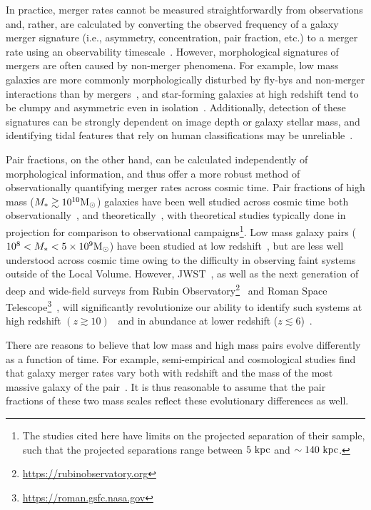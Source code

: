 \documentclass[twocolumn]{aastex631}
\begin{document}
    In practice, merger rates cannot be measured straightforwardly from observations and, rather, are calculated by converting the observed frequency of a galaxy merger signature (i.e., asymmetry, concentration, pair fraction, etc.) to a merger rate using an observability timescale~\citep[e.g.][]{Lotz2011}. However, morphological signatures of mergers are often caused by non-merger phenomena.
    For example, low mass galaxies are more commonly morphologically disturbed by fly-bys and non-merger interactions than by mergers~\citep{Martin2021}, 
    and star-forming galaxies at high redshift tend to be clumpy and asymmetric even in isolation~\citep{Wuyts2013}.
    Additionally, detection of these signatures can be strongly dependent on image depth or galaxy stellar mass, and identifying tidal features that rely on human classifications may be unreliable~\citep{Martin2022}.

    Pair fractions, on the other hand, can be calculated independently of morphological information, and thus offer a more robust method of observationally quantifying merger rates across cosmic time. 
    Pair fractions of high mass ($M_*\gtrsim10^{10}\mathrm{M}_\odot$) galaxies have been well studied across cosmic time both observationally~\citep[e.g.][]{Patton2002,Lin2004,Lin2008,Lotz2011,Ferreras2014, Man2016,Duncan2019}, and theoretically~\citep[e.g.][]{RG2015,Snyder2017,Snyder2023}, with theoretical studies typically done in projection for comparison to observational campaigns\footnote{The studies cited here have limits on the projected separation of their sample, such that the projected separations range between $5\,\mathrm{\,kpc}$ and $\sim140\,\mathrm{\,kpc}$.}.  
    Low mass galaxy pairs ($10^8<M_*<5\times10^9\mathrm{M}_\odot$) have been studied at low redshift~\citep[e.g.][]{Stierwalt2015,Pearson2016,Besla2018,Paudel2018,Luber2022},
    but are less well understood across cosmic time owing to the difficulty in observing faint systems outside of the Local Volume. 
    However, JWST~\citep{Gardner2006}, as well as the next generation of deep and wide-field surveys from Rubin Observatory\footnote{ \href{https://rubinobservatory.org/}{https://rubinobservatory.org}}~\citep{RUBIN2019} and Roman Space Telescope\footnote{\href{https://roman.gsfc.nasa.gov/}{https://roman.gsfc.nasa.gov}}~\citep{Spergel2015}, will significantly revolutionize our ability to identify such systems at high redshift $(z\gtrsim10)$~\citep{Behroozi2020} and in abundance at lower redshift ($z\lesssim6$)~\citep{Robertson2019a,Robertson2019b-LSST}.
    
    There are reasons to believe that low mass and high mass pairs evolve differently as a function of time.
    For example, semi-empirical and cosmological studies find that galaxy merger rates vary both with redshift and the mass of the most massive galaxy of the pair~\citep[see e.g.][]{Guo2008,Stewart2009,Hopkins2010,RG2015,Martin2021}.
    It is thus reasonable to assume that the pair fractions of these two mass scales reflect these evolutionary differences as well. 
\end{document}
